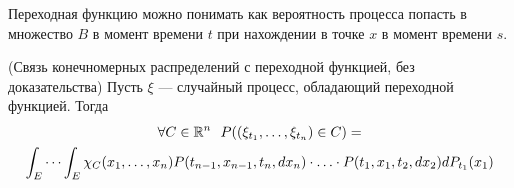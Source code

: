 \begin{note}
	Переходная функцию можно понимать как вероятность процесса попасть в множество $B$ в момент времени $t$ при нахождении в точке $x$ в момент времени $s$.
\end{note}

\begin{proposition} (Связь конечномерных распределений с переходной функцией, без доказательства)
	Пусть $\xi$ --- случайный процесс, обладающий переходной функцией. Тогда
	\begin{multline*}
		\forall C \in \mathbb{R}^n\ \ P((\xi_{t_1}, \ldots, \xi_{t_n}) \in C) =
		\\
		\int_E \cdots \int_E \chi_C(x_1, \ldots, x_n) P(t_{n - 1}, x_{n - 1}, t_n, dx_n) \cdot \ldots \cdot P(t_1, x_1, t_2, dx_2)dP_{t_1}(x_1)
	\end{multline*}
\end{proposition}